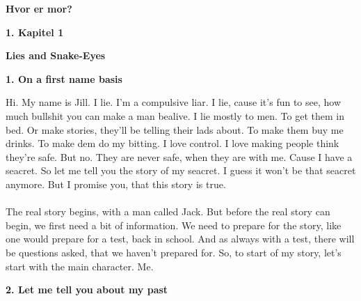 \documentclass[]{article}
\begin{document}
\newpage

\begin{center}
	\Large\textbf{Hvor er mor?}
\end{center}

\begin{center}
	\large\textbf{1. Kapitel 1}
\end{center}

\newpage

\begin{center}
	\Large\textbf{Lies and Snake-Eyes}
\end{center}

\begin{center}
	\large\textbf{1. On a first name basis}
\end{center}

Hi. My name is Jill. I lie. I'm a compulsive liar. I lie, cause it's fun to see, how much bullshit you can make a man bealive. I lie mostly to men. To get them in bed. Or make stories, they'll be telling their lads about. To make them buy me drinks. To make dem do my bitting. I love control. I love making people think they're safe. But no. They are never safe, when they are with me. Cause I have a seacret. So let me tell you the story of my seacret. I guess it won't be that seacret anymore. But I promise you, that this story is true.
\\ \\
The real story begins, with a man called Jack. But before the real story can begin, we first need a bit of information. We need to prepare for the story, like one would prepare for a test, back in school. And as always with a test, there will be questions asked, that we haven't prepared for. So, to start of my story, let's start with the main character. Me.

\begin{center}
	\large\textbf{2. Let me tell you about my past}
\end{center}
\end{document}
